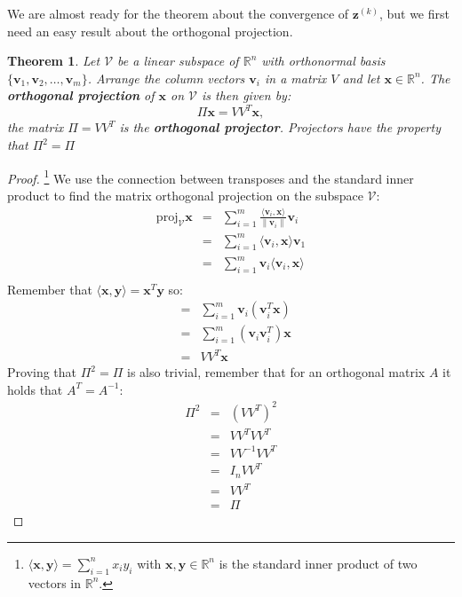 \documentclass[a4paper,11pt]{report}
\newtheorem{theorem}{Theorem}[section]
\newcommand{\R}{{\mathbb R}}
\begin{document}
  We are almost ready for the theorem about the convergence of $\mathbf{z}^{(k)}$, 
  but we first need an easy result about the orthogonal projection.
\begin{theorem}
  Let $\mathcal{V}$ be a linear subspace of $\R^n$ with orthonormal basis $\{\mathbf{v}_1, \mathbf{v}_2, \ldots, \mathbf{v}_m\}$.
  Arrange the column vectors $\mathbf{v}_i$ in a matrix $V$ and let $\mathbf{x} \in \R^n$. The 
  \textbf{orthogonal projection} of $\mathbf{x}$ on  $\mathcal{V}$ is then given by:
  $$\Pi\mathbf{x} = VV^T\mathbf{x},$$
  the matrix $\Pi = VV^T$ is the \textbf{orthogonal projector}. Projectors have 
  the property that $\Pi^2 = \Pi$
\end{theorem}
\begin{proof}\footnote{$\langle \mathbf{x}, \mathbf{y}\rangle = \sum_{i=1}^n x_i y_i$ with $\mathbf{x},\mathbf{y}\in \R^n$ is the standard inner product of  two vectors in $\R^n$.}
We use the connection between transposes and the standard inner product to find the matrix 
    orthogonal projection on the subspace $\mathcal{V}$:
  \begin{eqnarray*}
    \text{proj}_\mathcal{V}\mathbf{x} &=& \sum_{i=1}^{m} \frac{ \langle\mathbf{v}_i,\mathbf{x} \rangle}{\|\mathbf{v}_i\|}\mathbf{v}_i\\
  &=& \sum_{i=1}^{m} \langle\mathbf{v}_i,\mathbf{x}\rangle\mathbf{v}_1\\
  &=& \sum_{i=1}^{m} \mathbf{v}_i\langle\mathbf{v}_i,\mathbf{x}\rangle\\
  \end{eqnarray*}
  Remember that $\langle \mathbf{x}, \mathbf{y} \rangle = \mathbf{x}^T\mathbf{y}$ 
  so:
   \begin{eqnarray*}
  &=& \sum_{i=1}^{m} \mathbf{v}_i(\mathbf{v}_i^T\mathbf{x})\\
  &=& \sum_{i=1}^{m} (\mathbf{v}_i\mathbf{v}_i^T)\mathbf{x}\\
  &=& VV^T\mathbf{x}
  \end{eqnarray*}
Proving that $\Pi^2 =\Pi$ is also trivial, remember that for an orthogonal matrix $A$ it holds that $A^T = A^{-1}$:
  \begin{eqnarray*}
 \Pi^2 &=& (VV^T)^2\\
  &=& VV^TVV^T\\
  &=& VV^{-1}VV^T\\
  &=& I_nVV^T\\
  &=& VV^T\\
  &=& \Pi
  \end{eqnarray*}
\end{proof}
\end{document}
